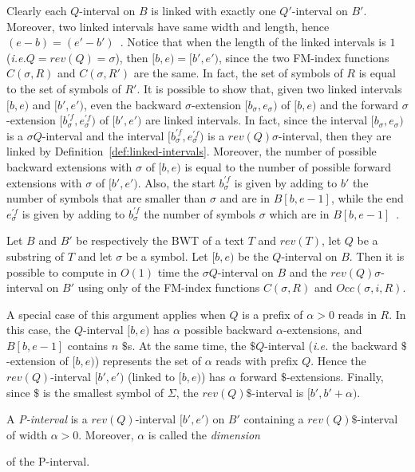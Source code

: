 \documentclass[runningheads,envcountsame,a4paper]{llncs}
\newcommand{\notaestesa}[2]{%
  {\sffamily {\bfseries #1}{\footnotesize #2}}%
  \marginpar{\framebox{\Large *}}%
}
\newcommand{\ie}{\textit{i.e.}\xspace}
\begin{document}
Clearly each $Q$-interval on $B$ is linked with exactly one $Q'$-interval on $B'$.
Moreover, two linked intervals have same width and length, hence $(e-b)=(e'-b')$~\cite{Lam2009,Simpson2010}.
Notice that when the length of the linked intervals is $1$ (\ie $Q=rev(Q)=\sigma$), then $[b,e)=[b',e')$,
since the two FM-index functions $C(\sigma, R)$ and $C(\sigma, R')$ are the same.
In fact, the set of symbols of $R$ is equal to the set of symbols of $R'$.
It is possible to show that, given two linked intervals $[b,e)$ and $[b',e')$, even the backward $\sigma$-extension $[b_{\sigma},e_{\sigma})$ of $[b,e)$ and the forward $\sigma$-extension $[b^{'f}_{\sigma},e^{'f}_{\sigma})$ of $[b',e')$ are linked intervals.
In fact, since the interval $[b_{\sigma},e_{\sigma})$ is a $\sigma Q$-interval and the interval $[b^{'f}_{\sigma},e^{'f}_{\sigma})$ is a $rev(Q) \sigma$-interval, then they are linked by Definition~\ref{def:linked-intervals}.
Moreover, the number of possible backward extensions with $\sigma$ of $[b,e)$ is equal to the number of possible forward extensions with $\sigma$ of $[b',e')$.
Also,  the start $b^{'f}_{\sigma}$ is given by adding to $b'$ the number of symbols that are smaller than $\sigma$ and are in $B[b,e-1]$,
while the end $e^{'f}_{\sigma}$ is given by adding to $b^{'f}_{\sigma}$ the number of symbols $\sigma$ which are in $B[b,e-1]$~\cite{Simpson2010}.

\begin{proposition}
\label{proposition:linked-intervals}
Let $B$ and $B'$ be respectively the BWT of a text $T$ and $rev(T)$, let $Q$ be a substring of $T$ and let $\sigma$ be a symbol.
Let $[b,e)$ be the $Q$-interval on $B$.
Then it is possible to compute in $O(1)$ time the $\sigma Q$-interval on $B$ and the $rev(Q) \sigma$-interval on $B'$
using only of the FM-index functions $C(\sigma, R)$ and $Occ(\sigma, i, R)$.
\end{proposition}

A special case of this argument applies when
$Q$ is a prefix of $\alpha > 0$ reads in $R$.
In this case, the $Q$-interval $[b,e)$ has $\alpha$ possible backward $\alpha$-extensions, and  $B[b,e-1]$ contains $n$ $\$$s.
At the same time, the $\$ Q$-interval (\ie the backward $\$$-extension of $[b,e)$) represents the set of $\alpha$ reads with prefix $Q$.
Hence the $rev(Q)$-interval $[b',e')$ (linked to $[b,e)$) has $\alpha$ forward $\$$-extensions.
Finally, since $\$$ is the smallest symbol of $\Sigma$, the $rev(Q) \$$-interval is $[b',b'+\alpha)$.

\begin{definition}
A \emph{P-interval} is a $rev(Q)$-interval $[b',e')$ on $B'$ containing
a $rev(Q)\$$-interval of width $\alpha>0$.
Moreover, $\alpha$ is called the \emph{dimension}\notaestesa{GDV}{ perchè dimension invece di width?}
of the P-interval.
\end{definition}
\end{document}
